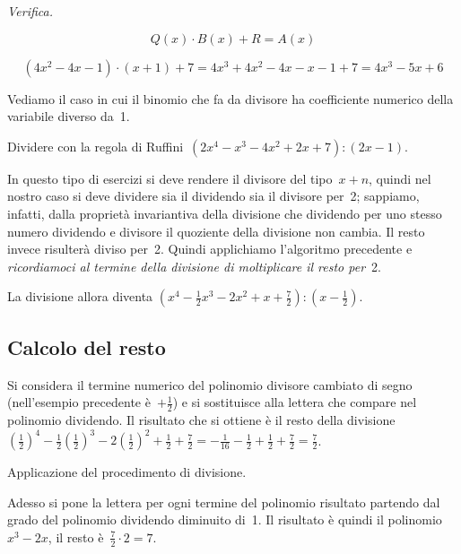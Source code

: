 \begin{exrig}
\textit{Verifica.}

\[Q(x)\cdot B(x)+R=A(x)\]

\[\left(4x^{2}-4x-1\right)\cdot (x+1)+7=4x^{3}+4x^{2}-4x-x-1+7=4x^{3}-5x+6\]

Vediamo il caso in cui il binomio che fa da divisore ha coefficiente
numerico della variabile diverso da~1.


\begin{esempio}
 Dividere con la regola di Ruffini~$\left(2x^{4}-x^{3}-4x^{2}+2x+7\right):(2x-1)$.

In questo tipo di esercizi si deve rendere il divisore del tipo~$x+n$,
quindi nel nostro caso si deve dividere sia il dividendo sia il
divisore per~2; sappiamo, infatti, dalla proprietà invariantiva della
divisione che dividendo per uno stesso numero dividendo e divisore il
quoziente della divisione non cambia. Il resto invece risulterà
diviso per~2. Quindi applichiamo l'algoritmo precedente
e \emph{ricordiamoci al termine della divisione di moltiplicare il
resto per}~2.

La divisione allora diventa
$\left(x^{4}-\frac{1}{2}x^{3}-2x^{2}+x+\frac{7}{2}\right):\left(x-\frac{1}{2}\right)$.
\end{esempio}
\end{exrig}

\ovalbox{\risolvii \ref{ese:11.31}, \ref{ese:11.32}, \ref{ese:11.33}, \ref{ese:11.34}, \ref{ese:11.35}}

\subsection{Calcolo del resto}

Si considera il termine numerico del polinomio divisore cambiato di
segno (nell'esempio precedente è~$+{\frac{1}{2}}$) e si
sostituisce alla lettera che compare nel polinomio dividendo. Il risultato che si
ottiene è il resto della
divisione~$\left(\frac{1}{2}\right)^{4}-\frac{1}{2}\left(\frac{1}{2}\right)^{3}-2\left(\frac{1}{2}\right)^{2}+\frac{1}{2}+\frac{7}{2}=-\frac{1}{16}-\frac{1}{2}+\frac{1}{2}+\frac{7}{2}=\frac{7}{2}$.

Applicazione del procedimento di divisione.
\begin{center}
 
\end{center}

Adesso si pone la lettera per ogni termine del polinomio risultato
partendo dal grado del polinomio dividendo diminuito di~1. Il risultato
è quindi il polinomio~$x^{3}-2x$, il resto è~$\frac{7}{2}\cdot2=7$.


